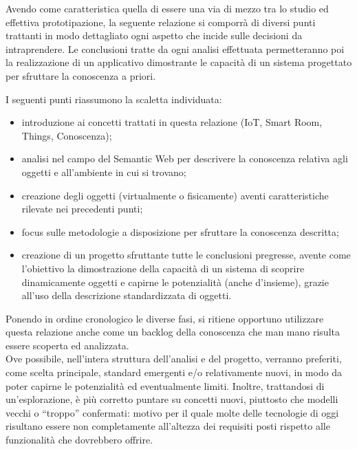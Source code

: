 \documentclass[12pt,a4paper,openright,oneside]{report}
\newcommand{\quotes}[1]{``#1''}
\begin{document}
Avendo come caratteristica quella di essere una via di mezzo tra lo studio ed effettiva prototipazione, la seguente relazione si comporrà di diversi punti trattanti in modo dettagliato ogni aspetto che incide sulle decisioni da intraprendere. Le conclusioni tratte da ogni analisi effettuata permetteranno poi la realizzazione di un applicativo dimostrante le capacità di un sistema progettato per sfruttare la conoscenza a priori. 

I seguenti punti riassumono la scaletta individuata:

\begin{itemize}
	\item introduzione ai concetti trattati in questa relazione (IoT, Smart Room, Things, Conoscenza);
	
	\item analisi nel campo del Semantic Web per descrivere la conoscenza relativa agli oggetti e all'ambiente in cui si trovano;
	
	\item creazione degli oggetti (virtualmente o fisicamente) aventi caratteristiche rilevate nei precedenti punti;
	
	\item focus sulle metodologie a disposizione per sfruttare la conoscenza descritta;
	
	\item creazione di un progetto sfruttante tutte le conclusioni pregresse, avente come l'obiettivo la dimostrazione della capacità di un sistema di scoprire dinamicamente oggetti e capirne le potenzialità (anche d'insieme), grazie all'uso della descrizione standardizzata di oggetti.
	
\end{itemize}

Ponendo in ordine cronologico le diverse fasi, si ritiene opportuno utilizzare questa relazione anche come un backlog della conoscenza che man mano risulta essere scoperta ed analizzata.\\

\label{new_tecnologies}
Ove possibile, nell'intera struttura dell'analisi e del progetto, verranno preferiti, come scelta principale, standard emergenti e/o relativamente nuovi, in modo da poter capirne le potenzialità ed eventualmente limiti. Inoltre, trattandosi di un'esplorazione, è più corretto puntare su concetti nuovi, piuttosto che modelli vecchi o \quotes{troppo} confermati: motivo per il quale molte delle tecnologie di oggi risultano essere non completamente all'altezza dei requisiti posti rispetto alle funzionalità che dovrebbero offrire.
\end{document}
